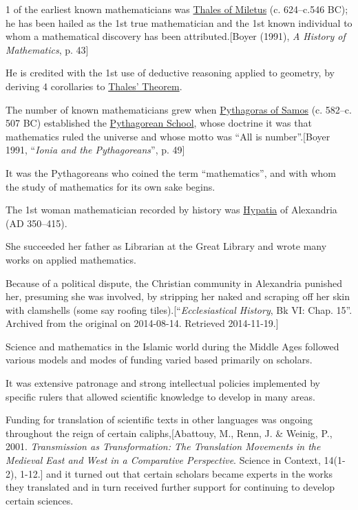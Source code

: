 \documentclass{article}
\begin{document}
%
1 of the earliest known mathematicians was \href{https://en.wikipedia.org/wiki/Thales_of_Miletus}{Thales of Miletus} (c. 624--c.546 BC); he has been hailed as the 1st true mathematician and the 1st known individual to whom a mathematical discovery has been attributed.[Boyer (1991), \textit{A History of Mathematics}, p. 43]

He is credited with the 1st use of deductive reasoning applied to geometry, by deriving 4 corollaries to \href{https://en.wikipedia.org/wiki/Thales%27_Theorem}{Thales' Theorem}.

%
The number of known mathematicians grew when \href{https://en.wikipedia.org/wiki/Pythagoras_of_Samos}{Pythagoras of Samos} (c. 582--c. 507 BC) established the \href{https://en.wikipedia.org/wiki/Pythagoreans}{Pythagorean School}, whose doctrine it was that mathematics ruled the universe and whose motto was ``All is number''.[Boyer 1991, ``\textit{Ionia and the Pythagoreans}'', p. 49]

It was the Pythagoreans who coined the term ``mathematics'', and with whom the study of mathematics for its own sake begins.

%
The 1st woman mathematician recorded by history was \href{https://en.wikipedia.org/wiki/Hypatia}{Hypatia} of Alexandria (AD 350--415).

She succeeded her father as Librarian at the Great Library and wrote many works on applied mathematics.

Because of a political dispute, the Christian community in Alexandria punished her, presuming she was involved, by stripping her naked and scraping off her skin with clamshells (some say roofing tiles).[``\textit{Ecclesiastical History}, Bk VI: Chap. 15''. Archived from the original on 2014-08-14. Retrieved 2014-11-19.]

%
Science and mathematics in the Islamic world during the Middle Ages followed various models and modes of funding varied based primarily on scholars.

It was extensive patronage and strong intellectual policies implemented by specific rulers that allowed scientific knowledge to develop in many areas.

Funding for translation of scientific texts in other languages was ongoing throughout the reign of certain caliphs,[Abattouy, M., Renn, J. \& Weinig, P., 2001. \textit{Transmission as Transformation: The Translation Movements in the Medieval East and West in a Comparative Perspective}. Science in Context, 14(1-2), 1-12.] and it turned out that certain scholars became experts in the works they translated and in turn received further support for continuing to develop certain sciences.
\end{document}
